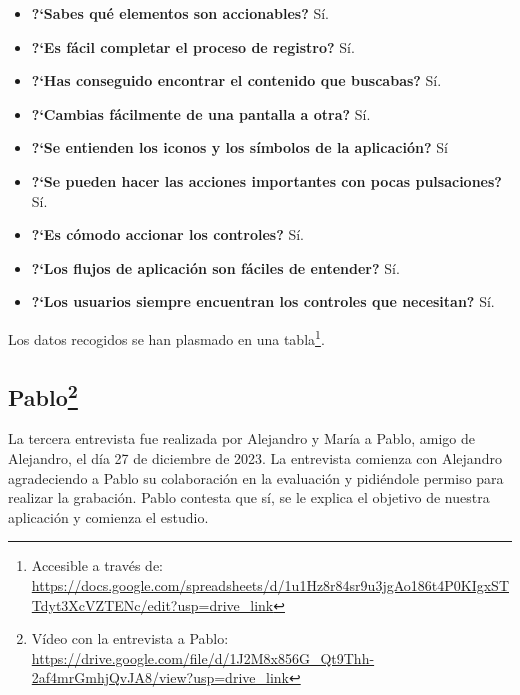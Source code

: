 \begin{itemize}
    \item \textbf{?`Sabes qué elementos son accionables?} Sí. 
    \item \textbf{?`Es fácil completar el proceso de registro?} Sí. 
    \item \textbf{?`Has conseguido encontrar el contenido que buscabas?} Sí.
    \item \textbf{?`Cambias fácilmente de una pantalla a otra?} Sí.
    \item \textbf{?`Se entienden los iconos y los símbolos de la aplicación?} Sí
    \item \textbf{?`Se pueden hacer las acciones importantes con pocas pulsaciones?} Sí.
    \item \textbf{?`Es cómodo accionar los controles?} Sí.
    \item \textbf{?`Los flujos de aplicación son fáciles de entender?} Sí.
    \item \textbf{?`Los usuarios siempre encuentran los controles que necesitan?} Sí.
\end{itemize}

Los datos recogidos se han plasmado en una tabla\footnote{Accesible a través de:
 \url{https://docs.google.com/spreadsheets/d/1u1Hz8r84sr9u3jgAo186t4P0KIgxSTTdyt3XcVZTENc/edit?usp=drive_link}}.

\subsection[Pablo]{Pablo\footnote{Vídeo con la entrevista a Pablo: \url{https://drive.google.com/file/d/1J2M8x856G_Qt9Thh-2af4mrGmhjQvJA8/view?usp=drive_link}}}

La tercera entrevista fue realizada por Alejandro y María a Pablo, amigo de Alejandro, el día 27 de diciembre de 2023. La entrevista comienza con Alejandro agradeciendo a Pablo su colaboración en la evaluación y pidiéndole permiso para realizar la grabación. Pablo contesta que sí, se le explica el objetivo de nuestra aplicación y comienza el estudio.

